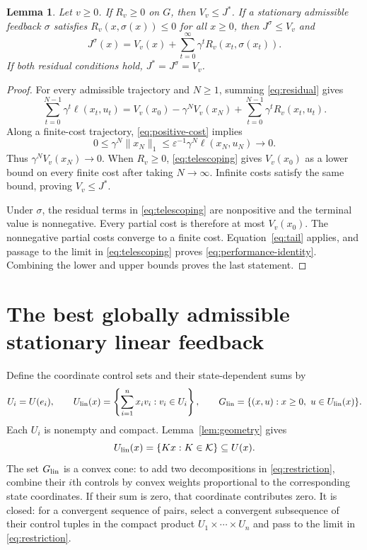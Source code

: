 \documentclass[10pt]{article}
\newtheorem{lemma}{Lemma}
\begin{document}
\begin{lemma}
\label{lem:verification}
Let $v\ge0$. If $R_v\ge0$ on $G$, then $V_v\le J^*$. If a stationary admissible feedback $\sigma$ satisfies $R_v(x,\sigma(x))\le0$ for all $x\ge0$, then $J^\sigma\le V_v$ and
\begin{equation}
 J^\sigma(x)=V_v(x)+\sum_{t=0}^\infty\gamma^tR_v(x_t,\sigma(x_t)).
 \label{eq:performance-identity}
\end{equation}
If both residual conditions hold, $J^*=J^\sigma=V_v$.
\end{lemma}
\begin{proof}
For every admissible trajectory and $N\ge1$, summing \eqref{eq:residual} gives
\begin{equation}
 \sum_{t=0}^{N-1}\gamma^t\ell(x_t,u_t)
 =V_v(x_0)-\gamma^NV_v(x_N)
   +\sum_{t=0}^{N-1}\gamma^tR_v(x_t,u_t).
 \label{eq:telescoping}
\end{equation}
Along a finite-cost trajectory, \eqref{eq:positive-cost} implies
\begin{equation}
 0\le\gamma^N\|x_N\|_1
 \le\varepsilon^{-1}\gamma^N\ell(x_N,u_N)\longrightarrow0.
 \label{eq:tail}
\end{equation}
Thus $\gamma^NV_v(x_N)\to0$. When $R_v\ge0$, \eqref{eq:telescoping} gives $V_v(x_0)$ as a lower bound on every finite cost after taking $N\to\infty$. Infinite costs satisfy the same bound, proving $V_v\le J^*$.

Under $\sigma$, the residual terms in \eqref{eq:telescoping} are nonpositive and the terminal value is nonnegative. Every partial cost is therefore at most $V_v(x_0)$. The nonnegative partial costs converge to a finite cost. Equation~\eqref{eq:tail} applies, and passage to the limit in \eqref{eq:telescoping} proves \eqref{eq:performance-identity}. Combining the lower and upper bounds proves the last statement.
\end{proof}

\section{The best globally admissible stationary linear feedback}

Define the coordinate control sets and their state-dependent sums by
\begin{equation}
 U_i=U(e_i),\qquad
 U_{\rm lin}(x)=\left\{\sum_{i=1}^n x_i v_i:v_i\in U_i\right\},\qquad
 G_{\rm lin}=\{(x,u):x\ge0,\ u\in U_{\rm lin}(x)\}.
 \label{eq:restriction}
\end{equation}
Each $U_i$ is nonempty and compact. Lemma~\ref{lem:geometry} gives
\begin{equation}
 U_{\rm lin}(x)=\{Kx:K\in\mathcal K\}\subseteq U(x).
 \label{eq:all-linear-actions}
\end{equation}
The set $G_{\rm lin}$ is a convex cone: to add two decompositions in \eqref{eq:restriction}, combine their $i$th controls by convex weights proportional to the corresponding state coordinates. If their sum is zero, that coordinate contributes zero. It is closed: for a convergent sequence of pairs, select a convergent subsequence of their control tuples in the compact product $U_1\times\cdots\times U_n$ and pass to the limit in \eqref{eq:restriction}.
\end{document}
